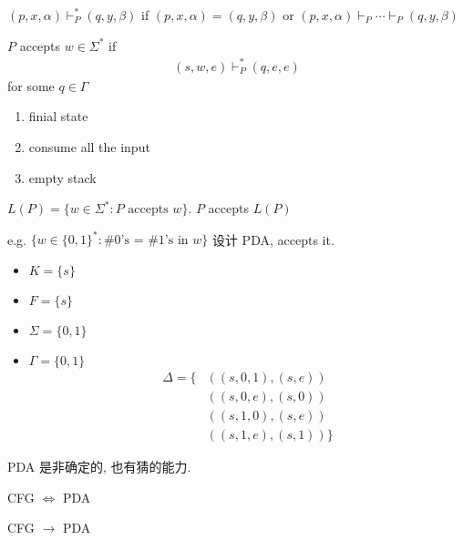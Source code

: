 \begin{definition}
    $(p,x,\alpha)\vdash_P^* (q,y,\beta)$ if $(p,x,\alpha)=(q,y,\beta)$ or $(p,x,\alpha)\vdash_P\cdots\vdash_P(q,y,\beta)$
\end{definition}

\begin{definition}
    $P$ accepts $w\in\Sigma^*$ if
    \begin{align*}
        (s,w,e)\vdash_P^*(q,e,e)
    \end{align*}
    for some $q\in\Gamma$
    \begin{enumerate}
        \item finial state
        \item consume all the input
        \item empty stack
    \end{enumerate}
\end{definition}

\begin{definition}
    $L(P)=\{ w\in\Sigma^*: P\text{ accepts }w \}$. $P$ accepts $L(P)$
\end{definition}

e.g. $\{ w\in \{ 0,1 \}^*: \text{\# 0's = \# 1's in } w\}$ 设计 PDA, accepts it. 
\begin{itemize}
    \item $K=\{ s\}$
    \item $F=\{ s\}$
    \item $\Sigma=\{ 0,1 \}$
    \item $\Gamma=\{ 0,1 \}$
    \begin{align*}
        \Delta=\{&((s,0,1), (s,e))\\
        &((s,0,e),(s,0))\\
        &((s,1,0), (s,e))\\
        &((s,1,e),(s,1))
         \}
    \end{align*}
\end{itemize}
PDA 是非确定的, 也有猜的能力. 

CFG $\iff$ PDA

CFG $\to$ PDA

